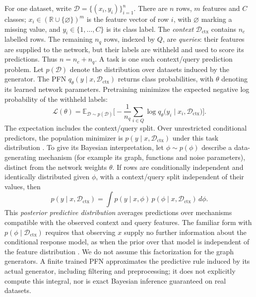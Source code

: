 \documentclass[11pt]{article}
\newcommand{\R}{\mathbb{R}}
\newcommand{\E}{\mathbb{E}}
\newcommand{\Dc}{\mathcal{D}_{\mathrm{ctx}}}
\begin{document}
For one dataset, write $\mathcal{D}=\{(x_i,y_i)\}_{i=1}^{n}$. There are $n$ rows, $m$ features
and $C$ classes; $x_i\in(\R\cup\{\varnothing\})^{m}$ is the feature vector of row $i$, with
$\varnothing$ marking a missing value, and $y_i\in\{1,\dots,C\}$ is its class label.
The \emph{context} $\Dc$ contains $n_c$ labelled rows. The remaining $n_q$ rows, indexed by $Q$,
are \emph{queries}: their features are supplied to the network, but their labels are withheld and
used to score its predictions. Thus $n=n_c+n_q$. A task is one such context/query prediction problem.
Let $p(\mathcal{D})$ denote the distribution over datasets induced by the generator. The PFN
$q_\theta(y\mid x,\Dc)$ returns class probabilities, with $\theta$ denoting its learned network
parameters. Pretraining minimizes the expected negative log probability of the withheld labels:
\begin{equation}
\mathcal{L}(\theta)=\E_{\mathcal{D}\sim p(\mathcal{D})}\Big[-\frac{1}{n_q}\sum_{i\in Q}
\log q_\theta\big(y_i\mid x_i,\Dc\big)\Big].
\label{eq:pfn}
\end{equation}
The expectation includes the context/query split. Over unrestricted conditional predictors, the
population minimizer is $p(y\mid x,\Dc)$ under this task distribution \cite{muller2022,nagler2023}.
To give its Bayesian interpretation, let $\phi\sim p(\phi)$ describe a data-generating mechanism
(for example its graph, functions and noise parameters), distinct from the network weights $\theta$.
If rows are conditionally independent and identically distributed given $\phi$, with a
context/query split independent of their values, then
\begin{equation}
p(y\mid x,\Dc)=\int p(y\mid x,\phi)\,p(\phi\mid x,\Dc)\,d\phi.
\end{equation}
This \emph{posterior predictive distribution} averages predictions over mechanisms compatible with
the observed context and query features. The familiar form with $p(\phi\mid\Dc)$ requires that
observing $x$ supply no further information about the conditional response model, as when the
prior over that model is independent of the feature distribution \cite{nagler2023}. We do not
assume this factorization for the graph generators. A finite trained PFN approximates the
predictive rule induced by its actual generator, including filtering and preprocessing; it does
not explicitly compute this integral, nor is exact Bayesian inference guaranteed on real datasets.
\end{document}

